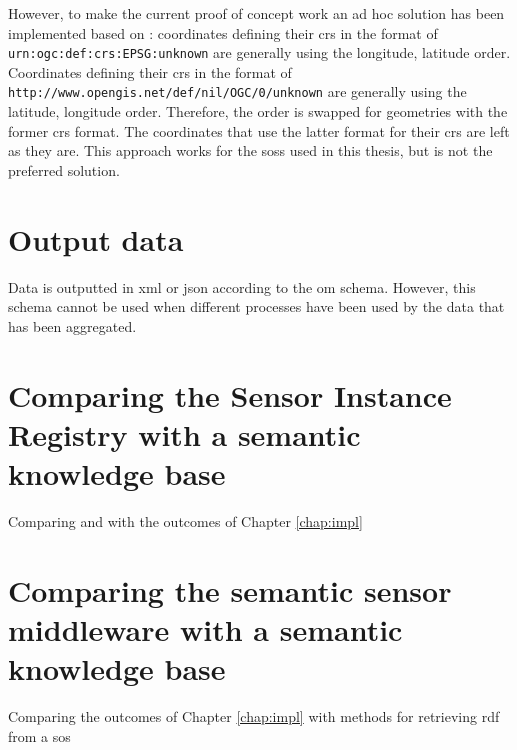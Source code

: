 However, to make the current proof of concept work an ad hoc solution has been implemented based on \cite{GEO:GDAL}: coordinates defining their \ac{crs} in the format of \texttt{urn:ogc:def:crs:EPSG:unknown} are generally using the longitude, latitude order. Coordinates defining their \ac{crs} in the format of \texttt{http://www.opengis.net/def/nil/OGC/0/unknown} are generally using the latitude, longitude order. Therefore, the order is swapped for geometries with the former \ac{crs} format. The coordinates that use the latter format for their \ac{crs} are left as they are. This approach works for the \aclp{sos} used in this thesis, but is not the preferred solution.   

\section{Output data}
Data is outputted in \ac{xml} or \ac{json} according to the \ac{om} schema. However, this schema cannot be used when different processes have been used by the data that has been aggregated.

\section{Comparing the Sensor Instance Registry with a semantic knowledge base}
Comparing \cite{SW:OGC3} and \cite{SW:OGC4} with the outcomes of Chapter \ref{chap:impl}

\section{Comparing the semantic sensor middleware with a semantic knowledge base}
Comparing the outcomes of Chapter \ref{chap:impl} with methods for retrieving \ac{rdf} from a \ac{sos}
